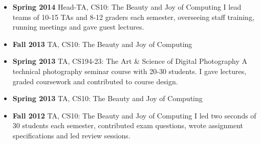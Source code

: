 \begin{itemize}
    \item \textbf{Spring 2014} Head-TA, CS10: The Beauty and Joy of Computing
    \newline
    \small I lead teams of 10-15 TAs and 8-12 graders each semester, overseeing staff training, running meetings and gave guest lectures.
    
    \item \textbf{Fall 2013} TA, CS10: The Beauty and Joy of Computing
    
    \item \textbf{Spring 2013} TA, CS194-23: The Art \& Science of Digital Photography
    \newline
    \small A technical photography seminar course with 20-30 students. I gave lectures, graded coursework and contributed to course design.
    
    \item \textbf{Spring 2013} TA, CS10: The Beauty and Joy of Computing
    \item \textbf{Fall 2012} TA, CS10: The Beauty and Joy of Computing
    \newline
    \small I led two seconds of 30 students each semester, contributed exam questions, wrote assignment specifications and led review sessions.
    
\end{itemize}
